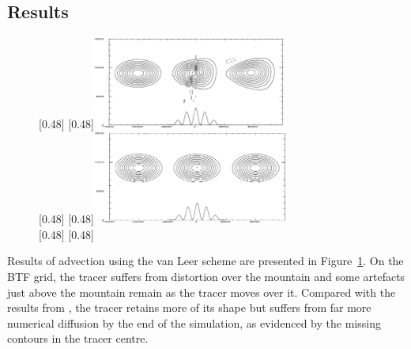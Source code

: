 \subsection{Results}
\begin{figure}
	\captionsetup[subfigure]{position=b}
	\centering
	[0.48\textwidth]{}
	\hfill
	[0.48\textwidth]{\vspace{0.43in}\includegraphics[height=1.2in]{img/schaer-btf-centred.png}}
\\
	[0.48\textwidth]{}
	\hfill
	[0.48\textwidth]{\vspace{0.43in}\includegraphics[height=1.2in]{img/schaer-sleve-centred.png}}
\\
	[0.48\textwidth]{}
	\hfill
	[0.48\textwidth]{\TODO{}}
%
	\caption{}
	\label{fig:advection:vanLeer}
\end{figure}

Results of advection using the van Leer scheme are presented in Figure~\ref{fig:advection:vanLeer}.  On the BTF grid, the tracer suffers from distortion over the mountain and some artefacts just above the mountain remain as the tracer moves over it.  Compared with the results from \textcite{schaer2002}, the tracer retains more of its shape but suffers from far more numerical diffusion by the end of the simulation, as evidenced by the missing contours in the tracer centre.  

